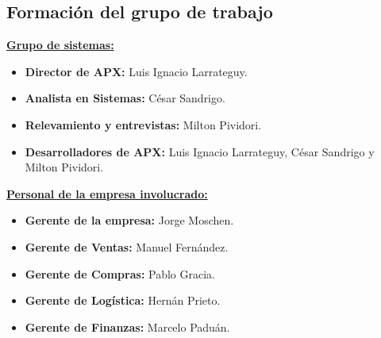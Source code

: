 \subsection{Formación del grupo de trabajo}

\underline{\textbf{Grupo de sistemas:}}
\begin{itemize}
  \item \textbf{Director de APX:} Luis Ignacio Larrateguy.
  \item \textbf{Analista en Sistemas:} César Sandrigo.
  \item \textbf{Relevamiento y entrevistas:} Milton Pividori.
  \item \textbf{Desarrolladores de APX:} Luis Ignacio Larrateguy, César
    Sandrigo y Milton Pividori.
\end{itemize}

\vspace{5pt}
\underline{\textbf{Personal de la empresa involucrado:}}
\begin{itemize}
  \item \textbf{Gerente de la empresa:} Jorge Moschen.
  \item \textbf{Gerente de Ventas:} Manuel Fernández.
  \item \textbf{Gerente de Compras:} Pablo Gracia.
  \item \textbf{Gerente de Logística:} Hernán Prieto.
  \item \textbf{Gerente de Finanzas:} Marcelo Paduán.
\end{itemize}

